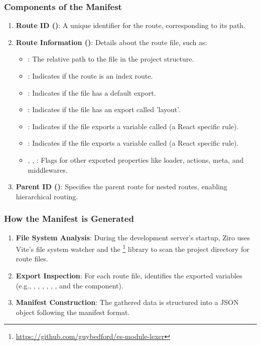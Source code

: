 \subsubsection{Components of the Manifest}
\begin{enumerate}
  \item \textbf{Route ID ()}: A unique identifier for the route, corresponding to its path.
  \item \textbf{Route Information ()}: Details about the route file, such as:
  \begin{itemize}
    \item {}: The relative path to the file in the project structure.
    \item {}: Indicates if the route is an index route.
    \item {}: Indicates if the file has a default export.
    \item {}: Indicates if the file has an export called 'layout'.
    \item {}: Indicates if the file exports a variable called  (a React specific rule).
    \item {}: Indicates if the file exports a variable called  (a React specific rule).
    \item {}, , : Flags for other exported properties like loader, actions, meta, and middlewares.
  \end{itemize}

  \item  \textbf{Parent ID ()}: Specifies the parent route for nested routes, enabling hierarchical routing.
\end{enumerate}

\subsubsection{How the Manifest is Generated}
\begin{enumerate}
  \item \textbf{File System Analysis}: During the development server's startup, Ziro uses Vite's file system watcher and the \footnote{\url{https://github.com/guybedford/es-module-lexer}} library to scan the project directory for route files.
  \item \textbf{Export Inspection}: For each route file,  identifies the exported variables (e.g., , , , , , , and the  component).
  \item \textbf{Manifest Construction}: The gathered data is structured into a JSON object following the manifest format.
\end{enumerate}

